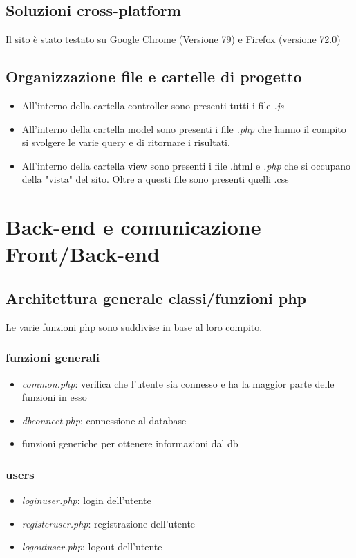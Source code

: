 \documentclass[12pt]{extarticle}
\begin{document}
\subsection{Soluzioni cross-platform}
Il sito è stato testato su Google Chrome (Versione 79) e Firefox (versione 72.0)

\subsection{Organizzazione file e cartelle di progetto}
\begin{itemize}
    \item All'interno della cartella controller sono presenti tutti i file \textit{.js}
    \item All'interno della cartella model sono presenti i file \textit{.php} che
    hanno il compito si svolgere le varie query e di ritornare i risultati.
    \item All'interno della cartella view sono presenti i file .html e \textit{.php} che
    si occupano della "vista" del sito. Oltre a questi file sono presenti
    quelli .css
\end{itemize}

\section{Back-end e comunicazione Front/Back-end}
\subsection{Architettura generale classi/funzioni php}
Le varie funzioni php sono suddivise in base al loro compito.

\subsubsection*{funzioni generali}
\begin{itemize}
    \item \textit{common.php}: verifica che l'utente sia connesso e ha la maggior parte delle funzioni in esso
    \item \textit{dbconnect.php}: connessione al database
    \item funzioni generiche per ottenere informazioni dal db
\end{itemize}

\subsubsection*{users}
\begin{itemize}
    \item \textit{loginuser.php}: login dell'utente
    \item \textit{registeruser.php}: registrazione dell'utente
    \item \textit{logoutuser.php}: logout dell'utente
\end{itemize}
\end{document}
